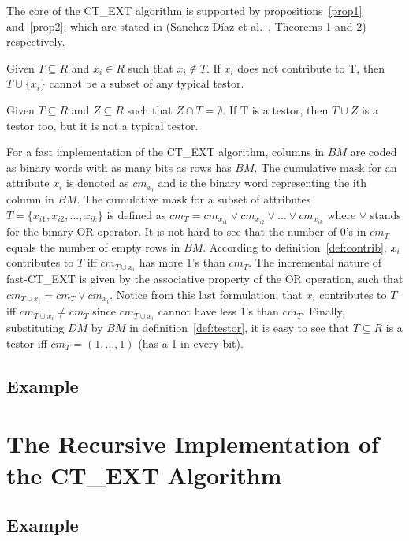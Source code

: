 \documentclass[citeauthoryear]{llncs}
\begin{document}
	The core of the CT\_EXT algorithm is supported by propositions~\ref{prop1} and~\ref{prop2}; which are stated in
	(Sanchez-D\'iaz et al.~\cite{Sanchez2010}, Theorems 1 and 2) respectively.
	
	\begin{proposition}\label{prop1} 
		Given $T \subseteq R$ and  $x_i \in R$ such that $x_i \notin T$. If $x_i$ does not contribute to T, then 
		$T\cup\{x_i\}$ cannot be a subset of any typical testor.
	\end{proposition}

	\begin{proposition}\label{prop2} 
		Given $T \subseteq R$ and $Z \subseteq R$ such that $Z \cap T = \emptyset$. If T is a testor, then $T \cup Z$ is a 
		testor too, but it is not a typical testor.
	\end{proposition}
	
	For a fast implementation of the CT\_EXT algorithm, columns in $BM$ are coded as binary words with as many bits as 
	rows has $BM$. The cumulative mask for an attribute $x_i$ is denoted as $cm_{x_i}$ and is the binary word representing
	the ith column in $BM$. The cumulative mask for a subset of attributes $T=\lbrace x_{i1},x_{i2},...,x_{ik} \rbrace$ is defined
	as $cm_T = cm_{x_{i1}} \vee cm_{x_{i2}} \vee ... \vee cm_{x_{ik}}$ where $\vee$ stands for the binary OR operator. It is
	not hard to see that the number of 0's in $cm_T$ equals the number of empty rows in $BM$. According to 
	definition~\ref{def:contrib}, $x_i$ contributes to $T$ iff $cm_{T\cup x_i}$ has more 1's than $cm_T$. The incremental nature
	of fast-CT\_EXT is given by the associative property of the OR operation, such that $cm_{T\cup x_i}=cm_T\vee cm_{x_i}$.
	Notice from this last formulation, that $x_i$ contributes to $T$ iff $cm_{T\cup x_i}\neq cm_T$ since $cm_{T\cup x_i}$
	cannot have less 1's than $cm_T$. Finally, substituting $DM$ by $BM$ in definition~\ref{def:testor}, it is easy to see
	that $T \subseteq R$ is a testor iff $cm_T=(1,...,1)$ (has a 1 in every bit).
%	
\subsection{Example}
%

\section{The Recursive Implementation of the CT\_EXT Algorithm}
%
\subsection{Example}
%
\end{document}
